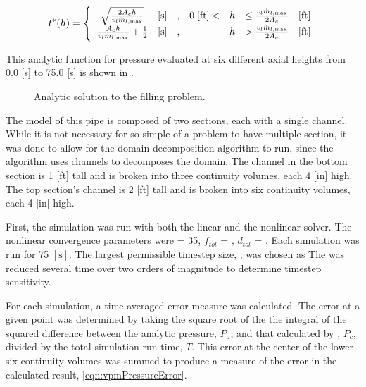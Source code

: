 \begin{equation}
\label{eqn:vmpTimeStar}
t^{*}(h)= 
 \left\{
\begin{array}{cclrcll}
\sqrt{\frac{2 A_c h}{v_{l} \dot{m}_{l,\text{max}}}} & [ \text{s} ] & , & 0\; [ \text{ft}] < & h & \leq \frac{v_l \dot{m}_{l,\text{max}}}{2 A_c} & [\text{ft}] \\
\frac{ A_c h }{v_{l} \dot{m}_{l,\text{max}}} + \onehalf & [ \text{s} ] & , &                & h & > \frac{v_l \dot{m}_{l,\text{max}}}{2 A_c} & [\text{ft}]
\end{array}\right.
\end{equation}

This analytic function for pressure evaluated at six different axial heights from 0.0 [s] to 75.0 [s] is shown in .

\begin{figure}[h!t]
\centering

\caption{Analytic solution to the filling problem.}
\label{fig:vmpAnalyticSol}
\end{figure}

The \cobra{} model of this pipe is composed of two sections, each with a single channel.
While it is not necessary for so simple of a problem to have multiple section, it was done to allow for the domain decomposition algorithm to run, since the algorithm uses channels to decomposes the domain.
The channel in the bottom section is 1 [ft] tall and is broken into three continuity volumes, each 4 [in] high.
The top section's channel is 2 [ft] tall and is broken into six continuity volumes, each 4 [in] high.

First, the simulation was run with both the linear and the nonlinear solver.
The nonlinear convergence parameters were \kmax{} = 35, $f_{tol}$ = , $d_{tol}$ = . 
Each simulation was run for 75 $[ \text{s} ]$.
The largest permissible timestep size, \dtmax{}, was chosen as 
The \dtmax{} was reduced several time over two orders of magnitude to determine timestep sensitivity.

For each simulation, a time averaged error measure was calculated.
The error at a given point was determined by taking the square root of the the integral of the squared difference between the analytic pressure, $P_{a}$, and that calculated by \cobra{}, $P_{c}$, divided by the total simulation run time, $T$.
This error at the center of the lower six continuity volumes was summed to produce a measure of the error in the calculated result, \eqref{eqn:vpmPressureError}.

